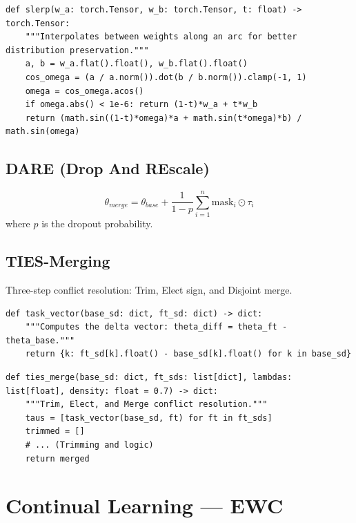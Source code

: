 \begin{lstlisting}[style=pythonstyle, caption={SLERP weight interpolation}, label=lst:slerp]
def slerp(w_a: torch.Tensor, w_b: torch.Tensor, t: float) -> torch.Tensor:
    """Interpolates between weights along an arc for better distribution preservation."""
    a, b = w_a.flat().float(), w_b.flat().float()
    cos_omega = (a / a.norm()).dot(b / b.norm()).clamp(-1, 1)
    omega = cos_omega.acos()
    if omega.abs() < 1e-6: return (1-t)*w_a + t*w_b
    return (math.sin((1-t)*omega)*a + math.sin(t*omega)*b) / math.sin(omega)
\end{lstlisting}

\subsection{DARE (Drop And REscale)}
\label{form:dare}

\[
  \theta_{merge} = \theta_{base} + \frac{1}{1-p} \sum_{i=1}^n \text{mask}_i \odot \tau_i
\]
where $p$ is the dropout probability.

\subsection{TIES-Merging}
\label{form:ties}

Three-step conflict resolution: Trim, Elect sign, and Disjoint merge.

\begin{lstlisting}[style=pythonstyle, caption={Task Vector}, label=lst:task_vec]
def task_vector(base_sd: dict, ft_sd: dict) -> dict:
    """Computes the delta vector: theta_diff = theta_ft - theta_base."""
    return {k: ft_sd[k].float() - base_sd[k].float() for k in base_sd}
\end{lstlisting}

\begin{lstlisting}[style=pythonstyle, caption={TIES-Merging}, label=lst:ties]
def ties_merge(base_sd: dict, ft_sds: list[dict], lambdas: list[float], density: float = 0.7) -> dict:
    """Trim, Elect, and Merge conflict resolution."""
    taus = [task_vector(base_sd, ft) for ft in ft_sds]
    trimmed = []
    # ... (Trimming and logic)
    return merged

\end{lstlisting}

\section{Continual Learning --- EWC}
\label{app:continual}


